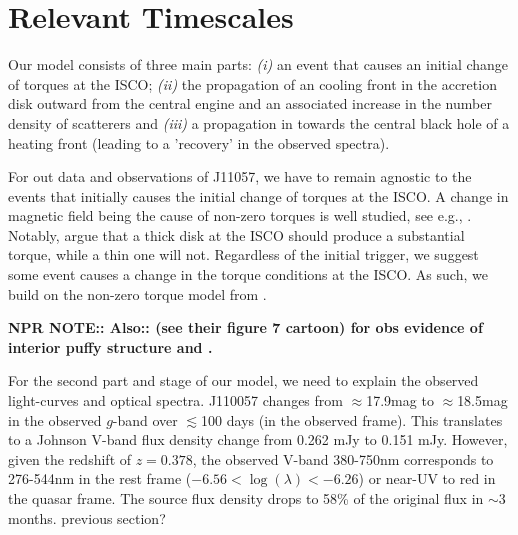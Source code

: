 \documentclass[11pt,a4paper]{article}
\begin{document}
\section*{Relevant Timescales}

Our model consists of three main parts: {\it (i)} an event that causes
an initial change of torques at the ISCO; {\it (ii)} the propagation
of an cooling front in the accretion disk outward from the central
engine and an associated increase in the number density of scatterers
and {\it (iii)} a propagation in towards the central black hole of a
heating front (leading to a 'recovery' in the observed spectra).

For out data and observations of J11057, we have to remain agnostic to
the events that initially causes the initial change of torques at the
ISCO.  A change in magnetic field being the cause of non-zero torques
is well studied, see e.g., \citet{Krolik1999, Gammie1999,
Agol_Krolik2000, Reynolds_Armitage2001}.  Notably,
\citet{Afshordi_Paczynski2003} argue that a thick disk at the ISCO
should produce a substantial torque, while a thin one will not.
Regardless of the initial trigger, we suggest some event causes 
a change in the torque conditions at the ISCO. As such, we build 
on the non-zero torque model from \citet{Zimmerman2005}. 

{\bf NPR NOTE:: Also:: \citet{Gardner_Done2017} 
(see their figure 7 cartoon) for obs evidence of interior puffy structure
and \citet{Jiang_Stone_Davis2016}. 
}

For the second part and stage of our model, we need to explain the 
observed light-curves and optical spectra. 
%
J110057 changes from $\approx$17.9mag to $\approx$18.5mag in the
observed $g$-band over $\lesssim$100 days (in the observed frame).
This translates to a Johnson V-band flux density change from 0.262 mJy
to 0.151 mJy.  However, given the redshift of $z=0.378$, the observed
V-band 380-750nm corresponds to 276-544nm in the rest frame ($-6.56 <
\log (\lambda) < -6.26$) or near-UV to red in the quasar frame. The
source flux density drops to 58\% of the original flux in $\sim$3
months. %
previous section?
\end{document}
